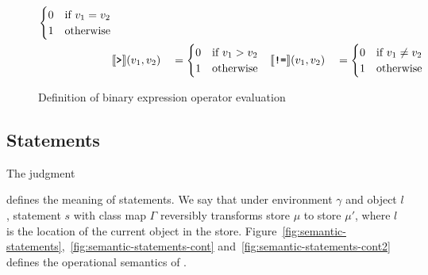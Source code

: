 \begin{figure}[ht]
\begin{align*}
\begin{cases}
            0 & \text{if}\ v_1 = v_2\\
            1 & \text{otherwise}
        \end{cases}\\
        &\llbracket\texttt{\textbf{>}}\rrbracket (v_1, v_2) &&= \begin{cases}
            0 & \text{if}\ v_1 > v_2\\ 
            1 & \text{otherwise}
        \end{cases}
        &\llbracket\texttt{\textbf{!=}}\rrbracket (v_1, v_2) &&&= \begin{cases}
            0 & \text{if}\ v_1 \not= v_2\\
            1 & \text{otherwise}
        \end{cases}
    \end{align*} 
    \caption{Definition of binary expression operator evaluation}
    \label{fig:binary-operator-evaluation}
\end{figure}


\subsection{Statements}
\label{subsec:semantics-statements}
The judgment
\begin{prooftree}
\end{prooftree}
defines the meaning of statements. We say that under environment $\gamma$ and object $l$, statement $s$ with class map $\Gamma$ reversibly transforms store $\mu$ to store $\mu'$, where $l$ is the location of the current object in the store. Figure~\ref{fig:semantic-statements},~\ref{fig:semantic-statements-cont} and~\ref{fig:semantic-statements-cont2} defines the operational semantics of \rooplpp.

